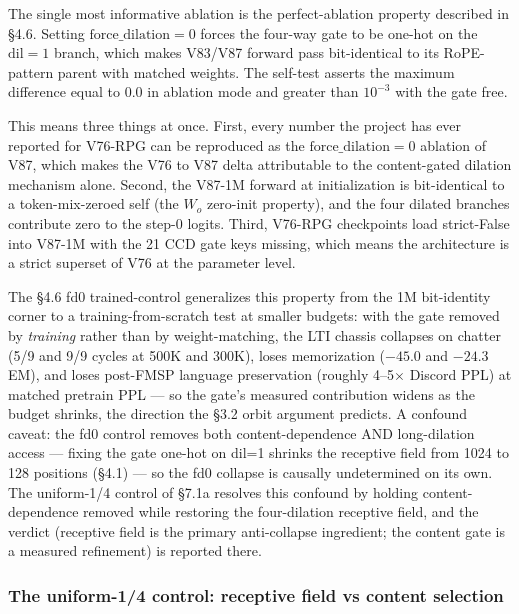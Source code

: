 \documentclass[11pt]{article}
\begin{document}
The single most informative ablation is the perfect-ablation property described in \S4.6. Setting $\text{force\_dilation}=0$ forces the four-way gate to be one-hot on the $\text{dil}=1$ branch, which makes V83/V87 forward pass bit-identical to its RoPE-pattern parent with matched weights. The self-test asserts the maximum difference equal to 0.0 in ablation mode and greater than $10^{-3}$ with the gate free.

This means three things at once. First, every number the project has ever reported for V76-RPG can be reproduced as the $\text{force\_dilation}=0$ ablation of V87, which makes the V76 to V87 delta attributable to the content-gated dilation mechanism alone. Second, the V87-1M forward at initialization is bit-identical to a token-mix-zeroed self (the $W_o$ zero-init property), and the four dilated branches contribute zero to the step-0 logits. Third, V76-RPG checkpoints load strict-False into V87-1M with the 21 CCD gate keys missing, which means the architecture is a strict superset of V76 at the parameter level.

The \S4.6 fd0 trained-control generalizes this property from the 1M bit-identity corner to a training-from-scratch test at smaller budgets: with the gate removed by \emph{training} rather than by weight-matching, the LTI chassis collapses on chatter (5/9 and 9/9 cycles at 500K and 300K), loses memorization ($-45.0$ and $-24.3$ EM), and loses post-FMSP language preservation (roughly 4--5$\times$ Discord PPL) at matched pretrain PPL --- so the gate's measured contribution widens as the budget shrinks, the direction the \S3.2 orbit argument predicts. A confound caveat: the fd0 control removes both content-dependence AND long-dilation access --- fixing the gate one-hot on dil=1 shrinks the receptive field from 1024 to 128 positions (\S4.1) --- so the fd0 collapse is causally undetermined on its own. The uniform-1/4 control of \S7.1a resolves this confound by holding content-dependence removed while restoring the four-dilation receptive field, and the verdict (receptive field is the primary anti-collapse ingredient; the content gate is a measured refinement) is reported there.

\subsubsection{The uniform-1/4 control: receptive field vs content selection}
\end{document}
